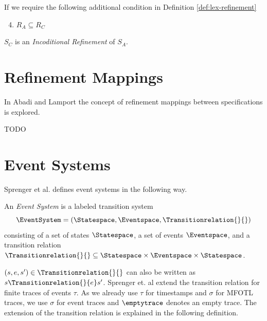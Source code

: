 \begin{definition}
    \label{def:lex-inconditional-refinement}
    If we require the following additional condition in Definition \ref{def:lex-refinement}
    \begin{enumerate}
        \setcounter{enumi}{3}
        \item $R_A \subseteq R_C$
    \end{enumerate}
    $S_C$ is an \emph{Incoditional Refinement} of $S_A$.
\end{definition}

\section{Refinement Mappings}
\label{section:refinement-mappings}
In Abadi and Lamport \cite{refinement-mappings} the concept of refinement mappings
between specifications is explored.

TODO

\section{Event Systems}
\label{section:event-systems}

Sprenger et al. \cite{igloo} defines event systems in the following way.

\begin{definition}
    \label{def:event-system}
    An \emph{Event System} is a labeled transition system
    $$
    \EventSystem = \left(\Statespace, \Eventspace, \Transitionrelation{}{} \right)
    $$
    consisting of a set of states $\Statespace$,
    a set of events $\Eventspace$,
    and a transition relation
    $\Transitionrelation{}{} \subseteq \Statespace \times \Eventspace \times \Statespace$.
\end{definition}

$(s,e,s') \in \Transitionrelation{}{}$ can also be written as
$s \Transitionrelation{}{e} s'$.
Sprenger et. al \cite{igloo} extend the transition relation for finite traces of events
$\tau$. As we already use $\tau$ for timestamps and $\sigma$ for MFOTL traces, we
use $\sigma$ for event traces and  $\emptytrace$ denotes an empty trace.
The extension of the transition relation is explained in the following definition.

